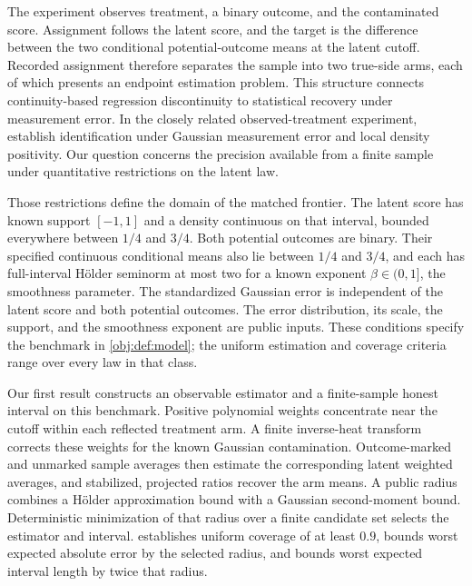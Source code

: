 \documentclass[11pt]{article}
\begin{document}
The experiment observes treatment, a binary outcome, and the contaminated score. Assignment follows the latent score, and the target is the difference between the two conditional potential-outcome means at the latent cutoff. Recorded assignment therefore separates the sample into two true-side arms, each of which presents an endpoint estimation problem. This structure connects continuity-based regression discontinuity \citep{Hahn2001,CattaneoTitiunik2022Survey} to statistical recovery under measurement error. In the closely related observed-treatment experiment, \citet[Assumptions 1Y, 2C, and 7; Proposition 4(b)]{PeiShen2017DevilTails} establish identification under Gaussian measurement error and local density positivity. Our question concerns the precision available from a finite sample under quantitative restrictions on the latent law.

Those restrictions define the domain of the matched frontier. The latent score has known support \([-1,1]\) and a density continuous on that interval, bounded everywhere between \(1/4\) and \(3/4\). Both potential outcomes are binary. Their specified continuous conditional means also lie between \(1/4\) and \(3/4\), and each has full-interval Hölder seminorm at most two for a known exponent \(\beta\in(0,1]\), the smoothness parameter. The standardized Gaussian error is independent of the latent score and both potential outcomes. The error distribution, its scale, the support, and the smoothness exponent are public inputs. These conditions specify the benchmark in \cref{obj:def:model}; the uniform estimation and coverage criteria range over every law in that class.

Our first result constructs an observable estimator and a finite-sample honest interval on this benchmark. Positive polynomial weights concentrate near the cutoff within each reflected treatment arm. A finite inverse-heat transform corrects these weights for the known Gaussian contamination. Outcome-marked and unmarked sample averages then estimate the corresponding latent weighted averages, and stabilized, projected ratios recover the arm means. A public radius combines a Hölder approximation bound with a Gaussian second-moment bound. Deterministic minimization of that radius over a finite candidate set selects the estimator and interval.  establishes uniform coverage of at least \(0.9\), bounds worst expected absolute error by the selected radius, and bounds worst expected interval length by twice that radius.
\end{document}
